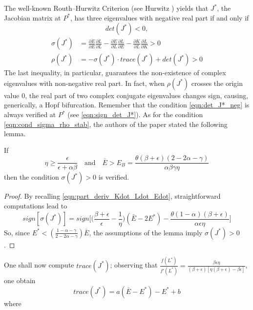 The well-known Routh–Hurwitz Criterion (see Hurwitz \cite{hurwitz_conditions_1964}) yields that $J^*$, the Jacobian matrix at $P^*$, has three eigenvalues with negative real part if and only if
\begin{equation} \label{eqn:det_J*_neg}
	det(J^*)<0,
\end{equation}
\begin{equation} \label{eqn:cond_sigma_rho_stab}
	\begin{split}
		\sigma(J^*) &= \frac{\partial\dot{E}}{\partial E}\frac{\partial\dot{L}}{\partial L}-\frac{\partial\dot{E}}{\partial L}\frac{\partial\dot{L}}{\partial E}-\frac{\partial\dot{K}}{\partial L}\frac{\partial\dot{L}}{\partial K}>0\\
		\rho(J^*) &= -\sigma(J^*)\cdot trace(J^*)+det(J^*)>0
	\end{split}
\end{equation}
The last inequality, in particular, guarantees the non-existence of complex eigenvalues with non-negative real part. In fact, when $\rho(J^*)$ crosses the origin value $0$, the real part of two complex conjugate eigenvalues changes sign, causing, generically, a Hopf bifurcation.
Remember that the condition \eqref{eqn:det_J*_neg} is always verified at $P^*$ (see \eqref{eqn:sign_det_J*}). As for the condition \eqref{eqn:cond_sigma_rho_stab}, the authors of the paper stated the following lemma.
\begin{lemma}
	If 
	\begin{equation} \label{eqn:lemma_3}
		\eta\geq \frac{\epsilon}{\epsilon+\alpha\beta} \quad \text{and} \quad \bar{E}>E_B=\frac{\theta(\beta+\epsilon)(2-2\alpha-\gamma)}{\alpha\beta\gamma\eta}
	\end{equation}
	then the condition $\sigma(J^*)>0$ is verified.
\end{lemma}
\begin{proof}
	By recalling \eqref{eqn:part_deriv_Kdot_Ldot_Edot}, straightforward computations lead to 
	$$ sign[\sigma(J^*)] = sign\Bigg[\Bigg(\frac{\beta+\epsilon}{\epsilon}-\frac{1}{\eta}\Bigg)(\bar{E}-2E^*)-\frac{\theta(1-\alpha)(\beta+\epsilon)}{\alpha\epsilon\eta}\Bigg] $$
	So, since $E^*<(\frac{1-\alpha-\gamma}{2-2\alpha-\gamma})\bar{E}$, the assumptions of the lemma imply $\sigma(J^*)>0$.
\end{proof}
One shall now compute $trace(J^*)$; observing that $\frac{f(L^*)}{f'(L^*)}=\frac{\beta\epsilon\eta}{(\beta+\epsilon)[\eta(\beta+\epsilon)-\beta\epsilon]}$, one obtain $$trace(J^*)=a(\bar{E}-E^*)-E^*+b$$ where 

